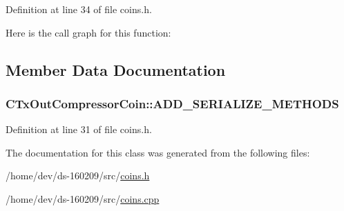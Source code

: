 Definition at line 34 of file coins.\+h.



Here is the call graph for this function\+:




\subsection{Member Data Documentation}
\hypertarget{class_c_tx_out_compressor_coin_ad61bf48ec0d5d0f53c3232b398f293c0}{}
\subsubsection[{A\+D\+D\+\_\+\+S\+E\+R\+I\+A\+L\+I\+Z\+E\+\_\+\+M\+E\+T\+H\+O\+D\+S}]{\setlength{\rightskip}{0pt plus 5cm}C\+Tx\+Out\+Compressor\+Coin\+::\+A\+D\+D\+\_\+\+S\+E\+R\+I\+A\+L\+I\+Z\+E\+\_\+\+M\+E\+T\+H\+O\+D\+S}\label{class_c_tx_out_compressor_coin_ad61bf48ec0d5d0f53c3232b398f293c0}


Definition at line 31 of file coins.\+h.



The documentation for this class was generated from the following files\+:\begin{DoxyCompactItemize}
\item 
/home/dev/ds-\/160209/src/\hyperlink{coins_8h}{coins.\+h}\item 
/home/dev/ds-\/160209/src/\hyperlink{coins_8cpp}{coins.\+cpp}\end{DoxyCompactItemize}
